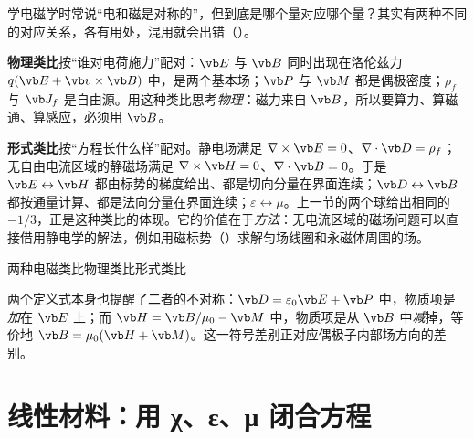 学电磁学时常说“电和磁是对称的”，但到底是哪个量对应哪个量？其实有两种不同的对应关系，各有用处，混用就会出错（）。


\textbf{物理类比}按“谁对电荷施力”配对：$\vb E$ 与 $\vb B$ 同时出现在洛伦兹力 $q(\vb E+\vb v\times\vb B)$ 中，是两个基本场；$\vb P$ 与 $\vb M$ 都是偶极密度；$\rho_f$ 与 $\vb J_f$ 是自由源。用这种类比思考\emph{物理}：磁力来自 $\vb B$，所以要算力、算磁通、算感应，必须用 $\vb B$。

\textbf{形式类比}按“方程长什么样”配对。静电场满足 $\nabla\times\vb E=0$、$\nabla\cdot\vb D=\rho_f$；无自由电流区域的静磁场满足 $\nabla\times\vb H=0$、$\nabla\cdot\vb B=0$。于是 $\vb E\leftrightarrow\vb H$ 都由标势的梯度给出、都是切向分量在界面连续；$\vb D\leftrightarrow\vb B$ 都按通量计算、都是法向分量在界面连续；$\varepsilon\leftrightarrow\mu$。上一节的两个球给出相同的 $-1/3$，正是这种类比的体现。它的价值在于\emph{方法}：无电流区域的磁场问题可以直接借用静电学的解法，例如用磁标势（）求解匀场线圈和永磁体周围的场。

\begin{compare}{两种电磁类比}{物理类比}{形式类比}
\end{compare}

两个定义式本身也提醒了二者的不对称：$\vb D=\varepsilon_0\vb E+\vb P$ 中，物质项是\emph{加}在 $\vb E$ 上；而 $\vb H=\vb B/\mu_0-\vb M$ 中，物质项是从 $\vb B$ 中\emph{减}掉，等价地 $\vb B=\mu_0(\vb H+\vb M)$。这一符号差别正对应偶极子内部场方向的差别。

\section{线性材料：用 χ、ε、μ 闭合方程}\label{sec:matter-linear}

